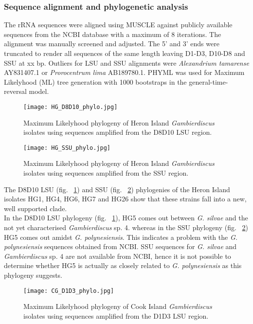 \documentclass[12pt]{article}
\begin{document}
\subsubsection{Sequence alignment and phylogenetic analysis}
The rRNA sequences were aligned using MUSCLE against publicly available sequences from the NCBI database with a maximum of 8 iterations. The alignment was manually screened and adjusted. The 5' and 3' ends were truncated to render all sequences of the same length leaving D1-D3, D10-D8 and SSU at xx bp. Outliers for LSU and SSU alignments were \emph{Alexandrium tamarense} AY831407.1 or \emph{Prorocentrum lima} AB189780.1.
PHYML was used for Maximum Likelyhood (ML) tree generation with 1000 bootstraps in the general-time-reversal model. \\



\begin{figure} 
\texttt{[image: HG\_D8D10\_phylo.jpg]} 
\caption{Maximum Likelyhood phylogeny of Heron Island \textit{Gambierdiscus} isolates using sequences amplified from the D8D10 LSU region.} 
\label{fig:HGD8D10}
\end{figure} 
\FloatBarrier 
\newpage

\begin{figure} 
\texttt{[image: HG\_SSU\_phylo.jpg]} 
\caption{Maximum Likelyhood phylogeny of Heron Island \textit{Gambierdiscus} isolates using sequences amplified from the SSU region.}
\label{fig:HGSSU} 
\end{figure} 
\FloatBarrier 
\newpage

The D8D10 LSU (fig. ~\ref{fig:HGD8D10}) and SSU (fig. ~\ref{fig:HGSSU}) phylogenies of the Heron Island isolates HG1, HG4, HG6, HG7 and HG26 show that these strains fall into a new, well supported clade.\\
In the D8D10 LSU phylogeny (fig. ~\ref{fig:HGD8D10}), HG5 comes out between \emph{G. silvae} and the not yet characterised \emph{Gambierdiscus} sp. 4. whereas in the SSU phylogeny (fig. ~\ref{fig:HGSSU}) HG5 comes out amidst \emph{G. polynesiensis}. This indicates a problem with the \emph{G. polynesiensis} sequences obtained from NCBI. SSU sequences for \emph{G. silvae} and \emph{Gambierdiscus} sp. 4 are not available from NCBI, hence it is not possible to determine whether HG5 is actually as closely related to \emph{G. polynesiensis} as this phylogeny suggests.\\

\begin{figure} 
\texttt{[image: CG\_D1D3\_phylo.jpg]} 
\caption{Maximum Likelyhood phylogeny of Cook Island \textit{Gambierdiscus} isolates using sequences amplified from the D1D3 LSU region.} 
\label{fig:CGD1D3}
\end{figure} 
\FloatBarrier 
\newpage
\end{document}
